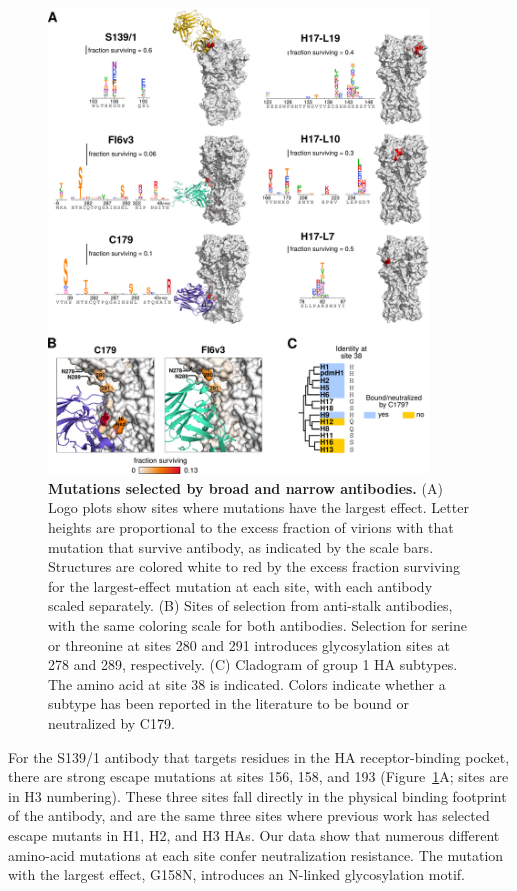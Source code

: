 \documentclass[11pt]{article}
\begin{document}
\begin{figure}[h!]
\centerline{\includegraphics[width=0.9\textwidth]{figs/logoplots_pymol/logoplots_pymol.pdf}}
\caption{
\label{fig:structures}
{\bf Mutations selected by broad and narrow antibodies.}
(A) Logo plots show sites where mutations have the largest effect.
Letter heights are proportional to the excess fraction of virions with that mutation that survive antibody, as indicated by the scale bars.
Structures are colored white to red by the excess fraction surviving for the largest-effect mutation at each site, with each antibody scaled separately.  
(B) Sites of selection from anti-stalk antibodies, with the same coloring scale for both antibodies. Selection for serine or threonine at sites 280 and 291 introduces glycosylation sites at 278 and 289, respectively.
(C) Cladogram of group 1 HA subtypes.
The amino acid at site 38 is indicated. 
Colors indicate whether a subtype has been reported in the literature to be bound or neutralized by C179.  
}
\end{figure}

For the S139/1 antibody that targets residues in the HA receptor-binding pocket, there are strong escape mutations at sites 156, 158, and 193 (Figure~\ref{fig:structures}A; sites are in H3 numbering). 
These three sites fall directly in the physical binding footprint of the antibody\cite{lee2012heterosubtypic}, and are the same three sites where previous work has selected escape mutants in H1, H2, and H3 HAs\cite{yoshida2009cross}. 
Our data show that numerous different amino-acid mutations at each site confer neutralization resistance.
The mutation with the largest effect, G158N, introduces an N-linked glycosylation motif.
\end{document}
